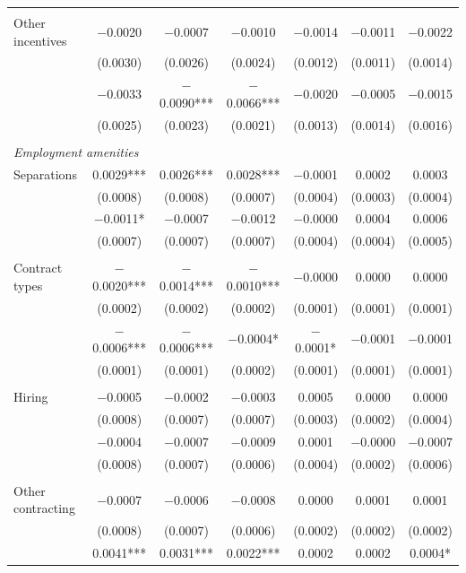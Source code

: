 \documentclass[12pt,letterpaper]{article}
\begin{document}
\begin{longtable}{l cccccc}
 & & & & & & \\
\quad Other incentives & $-$0.0020 & $-$0.0007 & $-$0.0010 & $-$0.0014 & $-$0.0011 & $-$0.0022 \\
  & (0.0030) & (0.0026) & (0.0024) & (0.0012) & (0.0011) & (0.0014) \\
  & $-$0.0033 & $-$0.0090*** & $-$0.0066*** & $-$0.0020 & $-$0.0005 & $-$0.0015 \\
  & (0.0025) & (0.0023) & (0.0021) & (0.0013) & (0.0014) & (0.0016) \\
 & & & & & & \\
\midrule
\multicolumn{7}{l}{\textit{Employment amenities}} \\
\quad Separations & 0.0029*** & 0.0026*** & 0.0028*** & $-$0.0001 & 0.0002 & 0.0003 \\
  & (0.0008) & (0.0008) & (0.0007) & (0.0004) & (0.0003) & (0.0004) \\
  & $-$0.0011* & $-$0.0007 & $-$0.0012 & $-$0.0000 & 0.0004 & 0.0006 \\
  & (0.0007) & (0.0007) & (0.0007) & (0.0004) & (0.0004) & (0.0005) \\
 & & & & & & \\
\quad Contract types & $-$0.0020*** & $-$0.0014*** & $-$0.0010*** & $-$0.0000 & 0.0000 & 0.0000 \\
  & (0.0002) & (0.0002) & (0.0002) & (0.0001) & (0.0001) & (0.0001) \\
  & $-$0.0006*** & $-$0.0006*** & $-$0.0004* & $-$0.0001* & $-$0.0001 & $-$0.0001 \\
  & (0.0001) & (0.0001) & (0.0002) & (0.0001) & (0.0001) & (0.0001) \\
 & & & & & & \\
\quad Hiring & $-$0.0005 & $-$0.0002 & $-$0.0003 & 0.0005 & 0.0000 & 0.0000 \\
  & (0.0008) & (0.0007) & (0.0007) & (0.0003) & (0.0002) & (0.0004) \\
  & $-$0.0004 & $-$0.0007 & $-$0.0009 & 0.0001 & $-$0.0000 & $-$0.0007 \\
  & (0.0008) & (0.0007) & (0.0006) & (0.0004) & (0.0002) & (0.0006) \\
 & & & & & & \\
\quad Other contracting & $-$0.0007 & $-$0.0006 & $-$0.0008 & 0.0000 & 0.0001 & 0.0001 \\
  & (0.0008) & (0.0007) & (0.0006) & (0.0002) & (0.0002) & (0.0002) \\
  & 0.0041*** & 0.0031*** & 0.0022*** & 0.0002 & 0.0002 & 0.0004* \\

\end{longtable}
\end{document}
